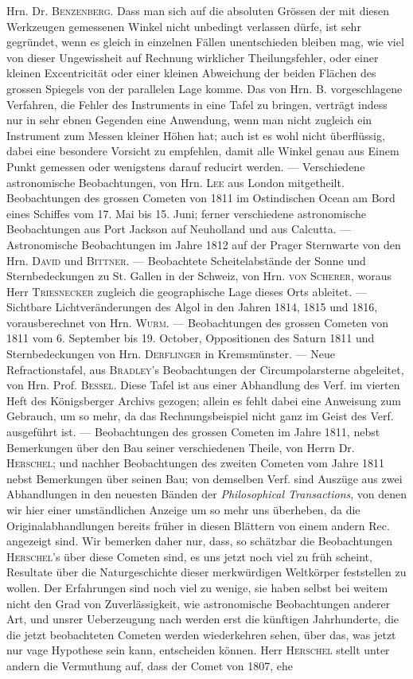 Hrn. Dr. \textsc{Benzenberg}. Dass man sich auf die absoluten Grössen der mit diesen Werkzeugen gemessenen Winkel nicht unbedingt verlassen dürfe, ist sehr gegründet, wenn es gleich in einzelnen Fällen unentschieden bleiben mag, wie viel von dieser Ungewissheit auf Rechnung wirklicher Theilungsfehler, oder einer kleinen Excentricität oder einer kleinen Abweichung der beiden Flächen des grossen Spiegels von der parallelen Lage komme. Das von Hrn. B. vorgeschlagene Verfahren, die Fehler des Instruments in eine Tafel zu bringen, verträgt indess nur in sehr ebnen Gegenden eine Anwendung, wenn man nicht zugleich ein Instrument zum Messen kleiner Höhen hat; auch ist es wohl nicht überflüssig, dabei eine besondere Vorsicht zu empfehlen, damit alle Winkel genau aus Einem Punkt gemessen oder wenigstens darauf reducirt werden. — Verschiedene astronomische Beobachtungen, von Hrn. \textsc{Lee} aus London mitgetheilt. Beobachtungen des grossen Cometen von 1811 im Ostindischen Ocean am Bord eines Schiffes vom 17. Mai bis 15. Juni; ferner verschiedene astronomische Beobachtungen aus Port Jackson auf Neuholland und aus Calcutta. — Astronomische Beobachtungen im Jahre 1812 auf der Prager Sternwarte von den Hrn. \textsc{David} und \textsc{Bittner}. — Beobachtete Scheitelabstände der Sonne und Sternbedeckungen zu St. Gallen in der Schweiz, von Hrn. \textsc{von Scherer}, woraus Herr \textsc{Triesnecker} zugleich die geographische Lage dieses Orts ableitet. — Sichtbare Lichtveränderungen des Algol in den Jahren 1814, 1815 und 1816, vorausberechnet von Hrn. \textsc{Wurm}. — Beobachtungen des grossen Cometen von 1811 vom 6. September bis 19. October, Oppositionen des Saturn 1811 und Sternbedeckungen von Hrn. \textsc{Derflinger} in Kremsmünster. — Neue Refractionstafel, aus \textsc{Bradley}'s Beobachtungen der Circumpolarsterne abgeleitet, von Hrn. Prof. \textsc{Bessel}. Diese Tafel ist aus einer Abhandlung des Verf. im vierten Heft des Königsberger Archivs gezogen; allein es fehlt dabei eine Anweisung zum Gebrauch, um so mehr, da das Rechnungsbeispiel nicht ganz im Geist des Verf. ausgeführt ist. — Beobachtungen des grossen Cometen im Jahre 1811, nebst Bemerkungen über den Bau seiner verschiedenen Theile, von Herrn Dr. \textsc{Herschel}; und nachher Beobachtungen des zweiten Cometen vom Jahre 1811 nebst Bemerkungen über seinen Bau; von demselben Verf. sind Auszüge aus zwei Abhandlungen in den neuesten Bänden der \emph{Philosophical Transactions}, von denen wir hier einer umständlichen Anzeige um so mehr uns überheben, da die Originalabhandlungen bereits früher in diesen Blättern von einem andern Rec. angezeigt sind. Wir bemerken daher nur, dass, so schätzbar die Beobachtungen \textsc{Herschel}'s über diese Cometen sind, es uns jetzt noch viel zu früh scheint, Resultate über die Naturgeschichte dieser merkwürdigen Weltkörper feststellen zu wollen. Der Erfahrungen sind noch viel zu wenige, sie haben selbst bei weitem nicht den Grad von Zuverlässigkeit, wie astronomische Beobachtungen anderer Art, und unsrer Ueberzeugung nach werden erst die künftigen Jahrhunderte, die die jetzt beobachteten Cometen werden wiederkehren sehen, über das, was jetzt nur vage Hypothese sein kann, entscheiden können. Herr \textsc{Herschel} stellt unter andern die Vermuthung auf, dass der Comet von 1807, ehe 